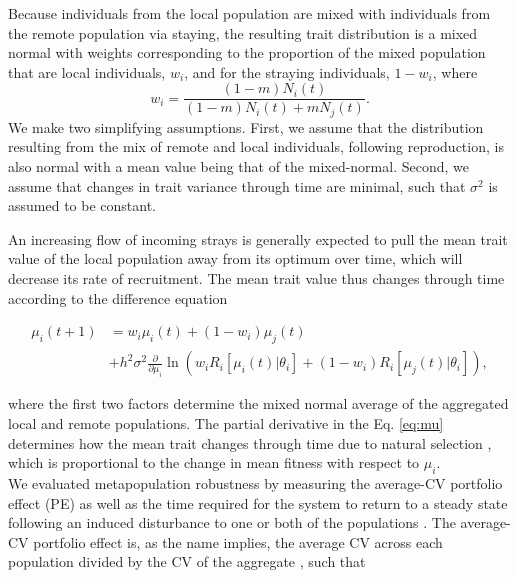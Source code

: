 \documentclass[twocolumn,preprintnumbers,amsmath,amssymb,superscriptaddress]{revtex4}
\begin{document}
\noindent Because individuals from the local population are mixed with individuals from the remote population via staying, the resulting trait distribution is a mixed normal with weights corresponding to the proportion of the mixed population that are local individuals, $w_i$, and for the straying individuals, $1-w_i$, where 
\begin{equation}
w_i=\frac{(1-m)N_i(t)}{(1-m) N_i(t) + m N_j(t)}.
\end{equation}
We make two simplifying assumptions.
First, we assume that the distribution resulting from the mix of remote and local individuals, following reproduction, is also normal with a mean value being that of the mixed-normal.
Second, we assume that changes in trait variance through time are minimal, such that $\sigma^2$ is assumed to be constant.



An increasing flow of incoming strays is generally expected to pull the mean trait value of the local population away from its optimum over time, which will decrease its rate of recruitment.
The mean trait value thus changes through time according to the difference equation

\begin{align}
  \label{eq:mu}
  \mu_i(t+1) &= w_i\mu_i(t) + (1-w_i)\mu_j(t) \\ \nonumber
  &+ h^2\sigma^2\frac{\partial}{\partial \mu_i}\ln\left(w_i R_i[\mu_i(t)|\theta_i] + (1-w_i)R_i[\mu_j(t)|\theta_i]  \right),
\end{align}

\noindent where the first two factors determine the mixed normal average of the aggregated local and remote populations.
The partial derivative in the Eq. \ref{eq:mu} determines how the mean trait changes through time due to natural selection \cite{Lande:1976ga}, which is proportional to the change in mean fitness with respect to $\mu_i$.
\\

\noindent We evaluated metapopulation robustness by measuring the average-CV portfolio effect (PE) \cite{Anderson:2014cx,Schindler:2015gf} as well as the time required for the system to return to a steady state following an induced disturbance to one or both of the populations \cite{Ovaskainen:2002il}.
The average-CV portfolio effect is, as the name implies, the average CV across each population divided by the CV of the aggregate \cite{Anderson:2013gb}, such that
\end{document}
